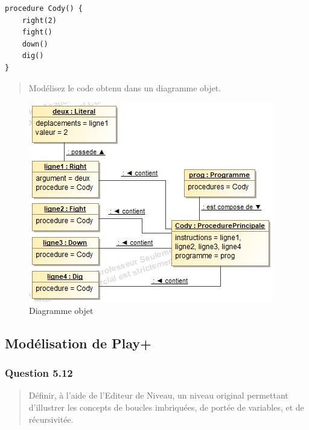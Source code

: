 \documentclass[]{article}
\begin{document}
\begin{verbatim}
procedure Cody() {
    right(2)
    fight()
    down()
    dig()
}
\end{verbatim}

\begin{quote}
Modélisez le code obtenu dans un diagramme objet.
\end{quote}

\begin{figure}
\centering
\includegraphics{./images_final/PlayQ11.png}
\caption{Diagramme objet}
\end{figure}

\hypertarget{moduxe9lisation-de-play-1}{%
\subsection{Modélisation de Play+}\label{moduxe9lisation-de-play-1}}

\hypertarget{question-5.12}{%
\subsubsection{Question 5.12}\label{question-5.12}}

\begin{quote}
Définir, à l'aide de l'Editeur de Niveau, un niveau original permettant
d'illustrer les concepts de boucles imbriquées, de portée de variables,
et de récursivitée.
\end{quote}
\end{document}
